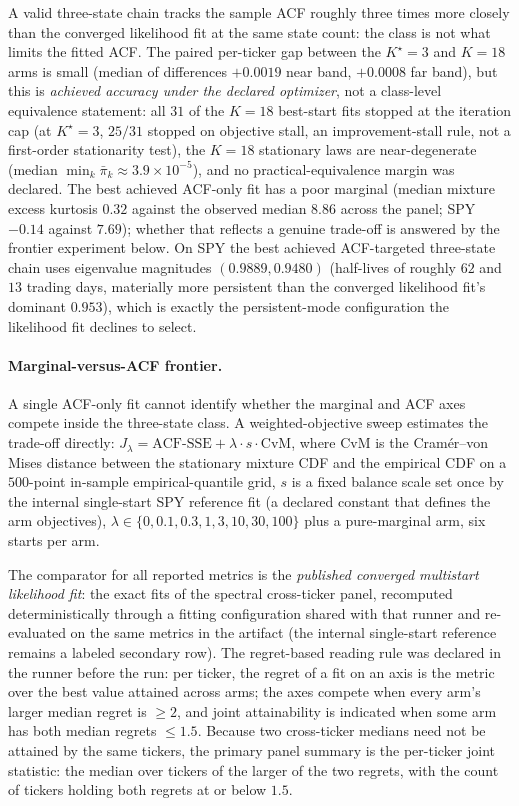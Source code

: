 A valid three-state chain tracks the sample ACF roughly three times more closely than the converged likelihood fit at the same state count: the class is not what limits the fitted ACF. The paired per-ticker gap between the $K^\star = 3$ and $K = 18$ arms is small (median of differences $+0.0019$ near band, $+0.0008$ far band), but this is \emph{achieved accuracy under the declared optimizer}, not a class-level equivalence statement: all $31$ of the $K = 18$ best-start fits stopped at the iteration cap (at $K^\star = 3$, $25/31$ stopped on objective stall, an improvement-stall rule, not a first-order stationarity test), the $K = 18$ stationary laws are near-degenerate (median $\min_k \bar\pi_k \approx 3.9 \times 10^{-5}$), and no practical-equivalence margin was declared. The best achieved ACF-only fit has a poor marginal (median mixture excess kurtosis $0.32$ against the observed median $8.86$ across the panel; SPY $-0.14$ against $7.69$); whether that reflects a genuine trade-off is answered by the frontier experiment below. On SPY the best achieved ACF-targeted three-state chain uses eigenvalue magnitudes $(0.9889, 0.9480)$ (half-lives of roughly $62$ and $13$ trading days, materially more persistent than the converged likelihood fit's dominant $0.953$), which is exactly the persistent-mode configuration the likelihood fit declines to select.

\paragraph{Marginal-versus-ACF frontier.}
A single ACF-only fit cannot identify whether the marginal and ACF axes compete inside the three-state class. A weighted-objective sweep estimates the trade-off directly: $J_\lambda = \mathrm{ACF\text{-}SSE} + \lambda \cdot s \cdot \mathrm{CvM}$, where CvM is the Cram\'er--von Mises distance between the stationary mixture CDF and the empirical CDF on a $500$-point in-sample empirical-quantile grid, $s$ is a fixed balance scale set once by the internal single-start SPY reference fit (a declared constant that defines the arm objectives), $\lambda \in \{0, 0.1, 0.3, 1, 3, 10, 30, 100\}$ plus a pure-marginal arm, six starts per arm.

The comparator for all reported metrics is the \emph{published converged multistart likelihood fit}: the exact fits of the spectral cross-ticker panel, recomputed deterministically through a fitting configuration shared with that runner and re-evaluated on the same metrics in the artifact (the internal single-start reference remains a labeled secondary row). The regret-based reading rule was declared in the runner before the run: per ticker, the regret of a fit on an axis is the metric over the best value attained across arms; the axes compete when every arm's larger median regret is $\ge 2$, and joint attainability is indicated when some arm has both median regrets $\le 1.5$. Because two cross-ticker medians need not be attained by the same tickers, the primary panel summary is the per-ticker joint statistic: the median over tickers of the larger of the two regrets, with the count of tickers holding both regrets at or below $1.5$.

